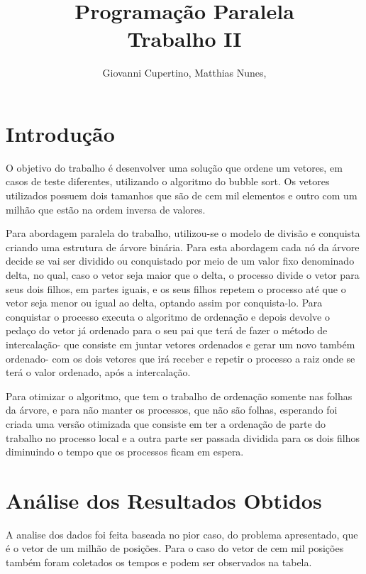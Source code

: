 \documentclass[9pt]{IEEEtran}
\title{Programação Paralela\\ Trabalho II}
\author{Giovanni Cupertino, Matthias Nunes, \IEEEmembership{Usuário pp12820}}
\begin{document}
\maketitle

\section{Introdução}

	O objetivo do trabalho é desenvolver uma solução que ordene um vetores, em
	casos de teste diferentes, utilizando o algoritmo do bubble sort. Os vetores
	utilizados possuem dois tamanhos que são de cem mil elementos e outro com um
	milhão que estão na ordem inversa de valores.

	Para abordagem paralela do trabalho, utilizou-se o modelo de divisão e
	conquista criando uma estrutura de árvore binária. Para esta abordagem cada
	nó da árvore decide se vai ser dividido ou conquistado por meio de um valor
	fixo denominado delta, no qual, caso o vetor seja maior que o delta, o
	processo divide o vetor para seus dois filhos, em partes iguais, e os seus
	filhos repetem o processo até que o vetor seja menor ou igual ao delta,
	optando assim por conquista-lo. Para conquistar o processo executa o
	algoritmo de ordenação e depois devolve o pedaço do vetor já ordenado para o
	seu pai que terá de fazer o método de intercalação- que consiste em juntar
	vetores ordenados e gerar um novo também ordenado- com os dois vetores que
	irá receber e repetir o processo a raiz onde se terá o valor ordenado, após
	a intercalação.

	Para otimizar o algoritmo, que tem o trabalho de ordenação somente nas
	folhas da árvore, e para não manter os processos, que não são folhas,
	esperando foi criada uma versão otimizada que consiste em ter a ordenação de
	parte do trabalho no processo local e a outra parte ser passada dividida
	para os dois filhos diminuindo o tempo que os processos ficam em espera.

\section{Análise dos Resultados Obtidos}

	A analise dos dados foi feita baseada no pior caso, do problema apresentado,
	que é o vetor de um milhão de posições. Para o caso do vetor de cem mil
	posições também foram coletados os tempos e podem ser observados na tabela.

\end{document}

